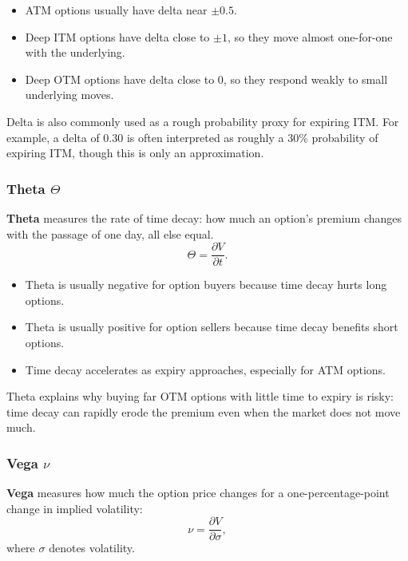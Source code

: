 \documentclass[12pt,openany]{book}
\begin{document}
\begin{itemize}[leftmargin=*]
    \item ATM options usually have delta near \(\pm 0.5\).
    \item Deep ITM options have delta close to \(\pm 1\), so they move almost one-for-one with the underlying.
    \item Deep OTM options have delta close to 0, so they respond weakly to small underlying moves.
\end{itemize}

Delta is also commonly used as a rough probability proxy for expiring ITM. For example, a delta of 0.30 is often interpreted as roughly a 30\% probability of expiring ITM, though this is only an approximation.

\subsubsection{Theta \(\Theta\)}

\textbf{Theta} measures the rate of time decay: how much an option's premium changes with the passage of one day, all else equal.
\begin{equation*}
    \Theta = \frac{\partial V}{\partial t}.
\end{equation*}

\begin{itemize}[leftmargin=*]
    \item Theta is usually negative for option buyers because time decay hurts long options.
    \item Theta is usually positive for option sellers because time decay benefits short options.
    \item Time decay accelerates as expiry approaches, especially for ATM options.
\end{itemize}

Theta explains why buying far OTM options with little time to expiry is risky: time decay can rapidly erode the premium even when the market does not move much.

\subsubsection{Vega \(\nu\)}

\textbf{Vega} measures how much the option price changes for a one-percentage-point change in implied volatility:
\begin{equation*}
    \nu = \frac{\partial V}{\partial \sigma},
\end{equation*}
where \(\sigma\) denotes volatility.
\end{document}
